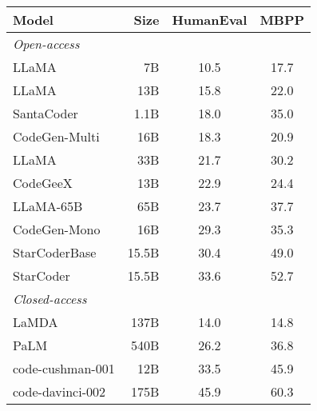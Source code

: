 \begin{tabular}{lrcc}
\toprule
\textbf{Model} & \textbf{Size} & \textbf{HumanEval} &  \textbf{MBPP} \\
\midrule
\emph{Open-access} \\
LLaMA             & 7B &       10.5 &  17.7 \\
LLaMA             & 13B &      15.8 &  22.0 \\
SantaCoder        & 1.1B &     18.0 & 35.0 \\
CodeGen-Multi     & 16B &      18.3 &  20.9 \\
LLaMA             & 33B &      21.7 &  30.2 \\
CodeGeeX          & 13B &      22.9 &  24.4 \\
LLaMA-65B         & 65B &      23.7 &  37.7 \\
CodeGen-Mono      & 16B &      29.3 &  35.3 \\
StarCoderBase     & 15.5B &      30.4 &  49.0 \\
StarCoder         & 15.5B &      33.6 &  52.7 \\
\midrule
\emph{Closed-access} \\
LaMDA             & 137B &     14.0 &  14.8 \\
PaLM              & 540B &     26.2 &  36.8 \\
code-cushman-001  & 12B &      33.5 &  45.9 \\
code-davinci-002  & 175B &     45.9 &  60.3 \\
\bottomrule
\end{tabular}